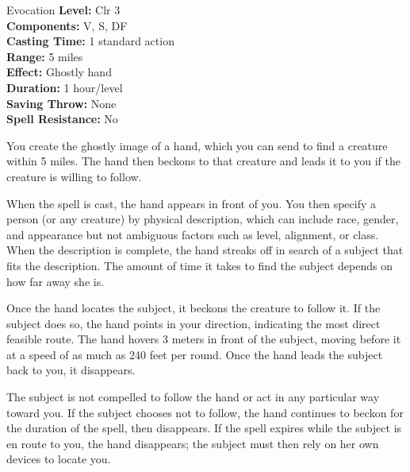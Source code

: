 {Evocation}
{
	\textbf{Level:}
	Clr 3\\
	\textbf{Components:}
	V, S, DF\\
	\textbf{Casting Time:}
	1 standard action\\
	\textbf{Range:}
	5 miles\\
	\textbf{Effect:}
	Ghostly hand\\
	\textbf{Duration:}
	1 hour/level\\
	\textbf{Saving Throw:}
	None\\
	\textbf{Spell Resistance:}
	No\\
}
{
	You create the ghostly image of a hand, which you can send to find a creature within 5 miles. The hand then beckons to that creature and leads it to you if the creature is willing to follow.


	When the spell is cast, the hand appears in front of you. You then specify a person (or any creature) by physical description, which can include race, gender, and appearance but not ambiguous factors such as level, alignment, or class. When the description is complete, the hand streaks off in search of a subject that fits the description. The amount of time it takes to find the subject depends on how far away she is.

	Once the hand locates the subject, it beckons the creature to follow it. If the subject does so, the hand points in your direction, indicating the most direct feasible route. The hand hovers 3 meters in front of the subject, moving before it at a speed of as much as 240 feet per round. Once the hand leads the subject back to you, it disappears.

	The subject is not compelled to follow the hand or act in any particular way toward you. If the subject chooses not to follow, the hand continues to beckon for the duration of the spell, then disappears. If the spell expires while the subject is en route to you, the hand disappears; the subject must then rely on her own devices to locate you.

}
